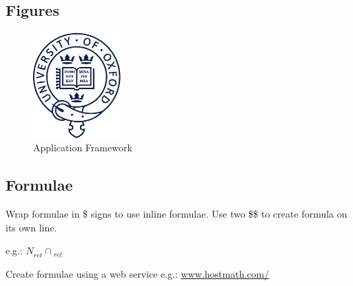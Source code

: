 \subsection{Figures}

\begin{figure}[H] %
  \vspace{5mm}
  \centering
  \includegraphics[width=0.3\textwidth]{figures/beltcrest.pdf}
  \caption{Application Framework}
  \label{fig:app-framework}
\end{figure}


\subsection{Formulae}
Wrap formulae in \$ signs to use inline formulae. Use two \$\$ to create formula on its own line.

e.g.: $N {_\overline{ret}} \cap {_{rel}}$

Create formulae using a web service e.g.: \url{www.hostmath.com/}
